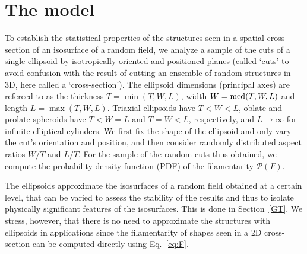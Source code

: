 \documentclass[useAMS,usenatbib]{mn2e}
\begin{document}
\section{\label{model}The model}
To establish the statistical properties of the structures seen in a spatial
cross-section of an isosurface of a random field, we analyze a sample of the
cuts of a single ellipsoid by isotropically oriented and positioned planes
(called `cuts' to avoid confusion with the result of cutting an ensemble of
random structures in 3D, here called a `cross-section'). The ellipsoid
dimensions (principal axes) are refereed to as the thickness $T = \min(T, W,
L)$, width $W = {\rm med}(T, W, L)$ and length $L = \max(T, W, L)$. Triaxial
ellipsoids have $T < W < L$, oblate and prolate spheroids have $T < W = L$ and
$T = W < L$, respectively, and $L\to\infty$ for infinite elliptical cylinders.
We first fix the shape of the ellipsoid and only vary the cut's orientation
and position, and then consider randomly distributed aspect ratios $W/T$ and
$L/T$. For the sample of the random cuts thus obtained, we compute the
probability density function (PDF) of the filamentarity ${\mathcal P}(F)$.

The ellipsoids approximate the isosurfaces of a random field obtained at a
certain level, that can be varied to assess the stability of the results and
thus to isolate physically significant features of the isosurfaces. This is
done in Section~\ref{GT}. We stress, however, that there is no need to
approximate the structures with ellipsoids in applications since the
filamentarity of shapes seen in a 2D cross-section can be computed directly
using Eq.~\eqref{eq:F}.
\end{document}
